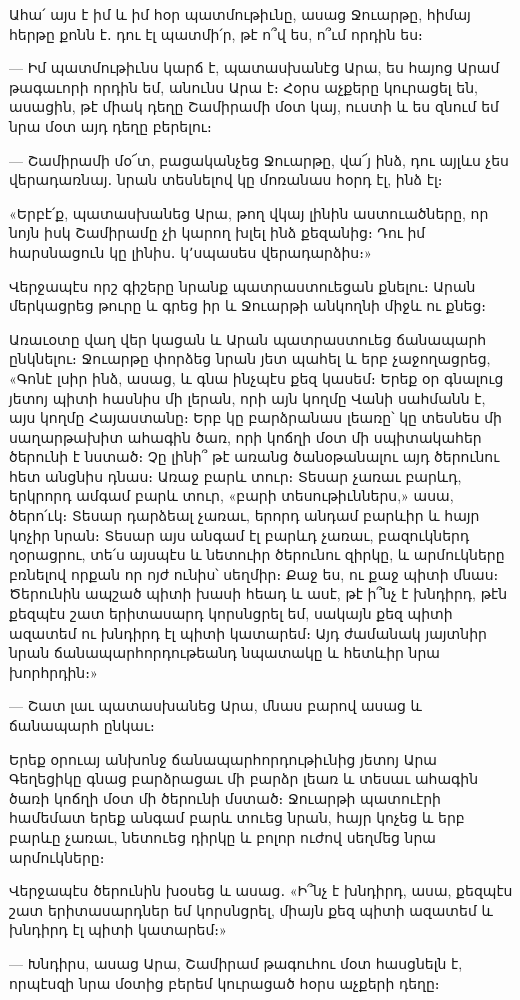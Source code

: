 \documentclass{article}
\begin{document}
{Ահա՛ այս է իմ և իմ հօր պատմութիւնը, ասաց Ջուարթը, հիմայ հերթը քոնն է․ դու էլ պատմի՛ր, թէ ո՞վ ես, ո՞ւմ որդին ես։

— Իմ պատմութիւնս կարճ է, պատասխանէց Արա, ես հայոց Արամ թագաւորի որդին եմ, անունս Արա է։ Հօրս աչքերը կուրացել են, ասացին, թէ միակ դեղը Շամիրամի մօտ կայ, ուստի և ես զնում եմ նրա մօտ այդ դեղը բերելու։

— Շամիրամի մօ՜տ, բացականչեց Ջուարթը, վա՜յ ինձ, դու այլևս չես վերադառնայ․ նրան տեսնելով կը մոռանաս հօրդ էլ, ինձ էլ։

«Երբէ՛ք, պատասխանեց Արա, թող վկայ լինին աստուածները, որ նոյն իսկ Շամիրամը չի կարող խլել ինձ քեզանից։ Դու իմ հարսնացուն կը լինիս․ կ՚սպասես վերադարձիս։»

Վերջապէս որշ գիշերը նրանք պատրաստուեցան քնելու։ Արան մերկացրեց թուրը և գրեց իր և Ջուարթի անկողնի միջև ու քնեց։

Առաւօտը վաղ վեր կացան և Արան պատրաստուեց ճանապարհ ընկնելու։ Ջուարթը փորձեց նրան յետ պահել և երբ չաջողացրեց, «Գոնէ լսիր ինձ, ասաց, և գնա ինչպէս քեզ կասեմ։ Երեք օր գնալուց յետոյ պիտի հասնիս մի լերան, որի այն կողմը Վանի սահմանն է, այս կողմը Հայաստանը։ Երբ կը բարձրանաս լեառը՝ կը տեսնես մի սաղարթախիտ ահագին ծառ, որի կոճղի մօտ մի սպիտակահեր ծերունի է նստած։ Չը լինի՞ թէ առանց ծանօթանալու այդ ծերունու հետ անցնիս դնաս։ Առաջ բարև տուր։ Տեսար չառաւ բարևդ, երկրորդ ամգամ բարև տուր, «բարի տեսութիւններս,» ասա, ծերո՛ւկ։ Տեսար դարձեալ չառաւ, երորդ անդամ բարևիր և հայր կոչիր նրան։ Տեսար այս անգամ էլ բարևդ չառաւ, բազուկներդ ղօրացրու, տե՛ս այսպէս և նետուիր ծերունու զիրկը, և արմուկները բռնելով որքան որ ոյժ ունիս՝ սեղմիր։ Քաջ ես, ու քաջ պիտի մնաս։ Ծերունին ապշած պիտի խասի հեադ և ասէ, թէ ի՞նչ է խնդիրդ, թէն քեզպէս շատ երիտասարդ կորսնցրել եմ, սակայն քեզ պիտի ազատեմ ու խնդիրդ էլ պիտի կատարեմ։ Այդ ժամանակ յայտնիր նրան ճանապարհորդութեանդ նպատակը և հետևիր նրա խորհրդին։»

— Շատ լաւ պատասխանեց Արա, մնաս բարով ասաց և ճանապարհ ընկաւ։

Երեք օրուայ անխոնջ ճանապարհորդութիւնից յետոյ Արա Գեղեցիկը գնաց բարձրացաւ մի բարձր լեառ և տեսաւ ահագին ծառի կոճղի մօտ մի ծերունի մստած։ Ջուարթի պատուէրի համեմատ երեք անգամ բարև տուեց նրան, հայր կոչեց և երբ բարևը չառաւ, նետուեց դիրկը և բոլոր ուժով սեղմեց նրա արմուկները։

Վերջապէս ծերունին խօսեց և ասաց․ «Ի՞նչ է խնդիրդ, ասա, քեզպէս շատ երիտասարդներ եմ կորսնցրել, միայն քեզ պիտի ազատեմ և խնդիրդ էլ պիտի կատարեմ։»

— Խնդիրս, ասաց Արա, Շամիրամ թագուհու մօտ հասցնելն է, որպէսզի նրա մօտից բերեմ կուրացած հօրս աչքերի դեղը։

}
\end{document}
